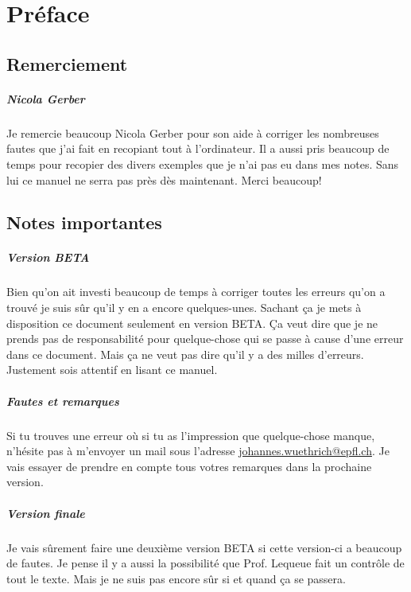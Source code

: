 \chapter{Préface}
%
\section{Remerciement}
%
\paragraph{Nicola Gerber} Je remercie beaucoup Nicola Gerber pour son aide à corriger les nombreuses fautes que j'ai fait en recopiant tout à l'ordinateur. Il a aussi pris beaucoup de temps pour recopier des divers exemples que je n'ai pas eu dans mes notes. Sans lui ce manuel ne serra pas près dès maintenant. Merci beaucoup!

%
\section{Notes importantes}
%
\paragraph{Version BETA} Bien qu'on ait investi beaucoup de temps à corriger toutes les erreurs qu'on a trouvé je suis sûr qu'il y en a encore quelques-unes. Sachant ça je mets à disposition ce document seulement en version BETA. Ça veut dire que je ne prends pas de responsabilité pour quelque-chose qui se passe à cause d'une erreur dans ce document. Mais ça ne veut pas dire qu'il y a des milles d'erreurs. Justement sois attentif en lisant ce manuel.

\paragraph{Fautes et remarques} Si tu trouves une erreur où si tu as l'impression que quelque-chose manque, n'hésite pas à m'envoyer un mail sous l'adresse \href{mailto:johannes.wuethrich@epfl.ch}{johannes.wuethrich@epfl.ch}. Je vais essayer de prendre en compte tous votres remarques dans la prochaine version.

\paragraph{Version finale} Je vais sûrement faire une deuxième version BETA si cette version-ci a beaucoup de fautes. Je pense il y a aussi la possibilité que Prof. Lequeue fait un contrôle de tout le texte. Mais je ne suis pas encore sûr si et quand ça se passera. 
